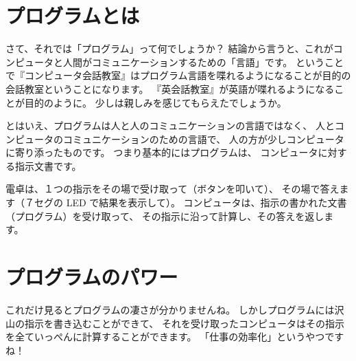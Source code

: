 \documentclass[dvipdfmx,autodetect-engine,10pt,b5paper,papersize,openany,dvipsnames]{jsbook}
\begin{document}
\begin{multicols}{2}
\section*{プログラムとは}
さて、それでは「プログラム」って何でしょうか？
結論から言うと、これがコンピュータと人間がコミュニケーションするための「言語」です。
ということで『コンピュータ会話教室』はプログラム言語を喋れるようになることが目的の
会話教室ということになります。
『英会話教室』が英語が喋れるようになることが目的のように。
少しは親しみを感じてもらえたでしょうか。

とはいえ、プログラムは人と人のコミュニケーションの言語ではなく、
人とコンピュータのコミュニケーションのための言語で、
人の方が少しコンピュータに寄り添ったものです。
つまり基本的にはプログラムは、
コンピュータに対する指示文書です。

電卓は、１つの指示をその場で受け取って（ボタンを叩いて）、
その場で答えます（７セグの LED で結果を表示して）。
コンピュータは、指示の書かれた文書（プログラム）を受け取って、
その指示に沿って計算し、その答えを返します。


\vspace{1.5cm}

\section*{プログラムのパワー}
これだけ見るとプログラムの凄さが分かりませんね。
しかしプログラムには沢山の指示を書き込むことができて、
それを受け取ったコンピュータはその指示を全ていっぺんに計算することができます。
「仕事の効率化」というやつですね！



\end{multicols}
\end{document}
